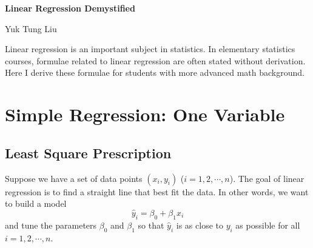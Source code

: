 \documentclass[11pt]{article}
\newcommand{\beq}{\begin{equation}}
\newcommand{\eeq}{\end{equation}}
\begin{document}
\begin{center}
{\huge {\bf Linear Regression Demystified}}

{\large Yuk Tung Liu}
\end{center}

\bigskip

Linear regression is an important subject in statistics. In elementary 
statistics courses, formulae related to linear regression are often 
stated without derivation. Here I derive these formulae 
for students with more advanced math background.  

\section{Simple Regression: One Variable}

\subsection{Least Square Prescription}

Suppose we have a set of data points $(x_i,y_i)$ ($i=1,2,\cdots,n$). The 
goal of linear regression is to find a straight line that best fit the data. 
In other words, we want to build a model 
\beq
  \hat{y}_i = \beta_0 + \beta_1 x_i 
\label{def:yhat}
\eeq 
and tune the parameters $\beta_0$ and $\beta_1$ so that $\hat{y}_i$ is as 
close to $y_i$ as possible for all $i=1,2,\cdots,n$.
\end{document}
